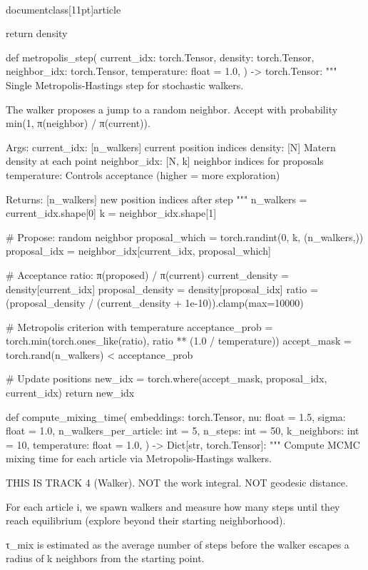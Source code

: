 \\documentclass[11pt]{article}
\begin{document}
\begin{CodeBlock}
    return density


def metropolis_step(
    current_idx: torch.Tensor,
    density: torch.Tensor,
    neighbor_idx: torch.Tensor,
    temperature: float = 1.0,
) -> torch.Tensor:
    """
    Single Metropolis-Hastings step for stochastic walkers.

    The walker proposes a jump to a random neighbor.
    Accept with probability min(1, π(neighbor) / π(current)).

    Args:
        current_idx: [n_walkers] current position indices
        density: [N] Matern density at each point
        neighbor_idx: [N, k] neighbor indices for proposals
        temperature: Controls acceptance (higher = more exploration)

    Returns:
        [n_walkers] new position indices after step
    """
    n_walkers = current_idx.shape[0]
    k = neighbor_idx.shape[1]

    # Propose: random neighbor
    proposal_which = torch.randint(0, k, (n_walkers,))
    proposal_idx = neighbor_idx[current_idx, proposal_which]

    # Acceptance ratio: π(proposed) / π(current)
    current_density = density[current_idx]
    proposal_density = density[proposal_idx]
    ratio = (proposal_density / (current_density + 1e-10)).clamp(max=10000)

    # Metropolis criterion with temperature
    acceptance_prob = torch.min(torch.ones_like(ratio), ratio ** (1.0 / temperature))
    accept_mask = torch.rand(n_walkers) < acceptance_prob

    # Update positions
    new_idx = torch.where(accept_mask, proposal_idx, current_idx)
    return new_idx


def compute_mixing_time(
    embeddings: torch.Tensor,
    nu: float = 1.5,
    sigma: float = 1.0,
    n_walkers_per_article: int = 5,
    n_steps: int = 50,
    k_neighbors: int = 10,
    temperature: float = 1.0,
) -> Dict[str, torch.Tensor]:
    """
    Compute MCMC mixing time for each article via Metropolis-Hastings walkers.

    THIS IS TRACK 4 (Walker). NOT the work integral. NOT geodesic distance.

    For each article i, we spawn walkers and measure how many steps
    until they reach equilibrium (explore beyond their starting neighborhood).

    τ_mix is estimated as the average number of steps before the walker
    escapes a radius of k neighbors from the starting point.


\end{CodeBlock}
\end{document}

